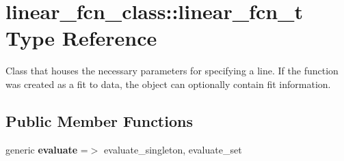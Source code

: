\hypertarget{structlinear__fcn__class_1_1linear__fcn__t}{}\section{linear\+\_\+fcn\+\_\+class\+:\+:linear\+\_\+fcn\+\_\+t Type Reference}
\label{structlinear__fcn__class_1_1linear__fcn__t}


Class that houses the necessary parameters for specifying a line. If the function was created as a fit to data, the object can optionally contain fit information.  


\subsection*{Public Member Functions}
\begin{DoxyCompactItemize}
\item 
\hypertarget{structlinear__fcn__class_1_1linear__fcn__t_ab7aaa3483a2cbc10479c7e91d12883b8}{}\label{structlinear__fcn__class_1_1linear__fcn__t_ab7aaa3483a2cbc10479c7e91d12883b8} 
generic {\bfseries evaluate} =$>$ evaluate\+\_\+singleton, evaluate\+\_\+set
\end{DoxyCompactItemize}
